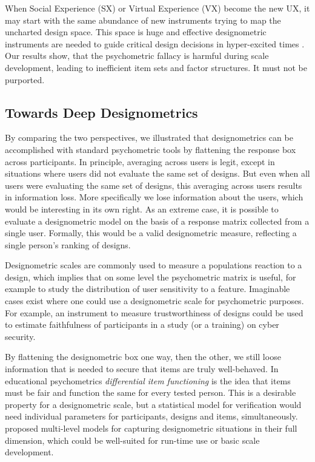 \documentclass[
  authoryear,
  review]{elsarticle}
\begin{document}
When Social Experience (SX) or Virtual Experience (VX) become the new
UX, it may start with the same abundance of new instruments trying to
map the uncharted design space. This space is huge and effective
designometric instruments are needed to guide critical design decisions
in hyper-excited times \citep{hypecycle2023}. Our results show, that the
psychometric fallacy is harmful during scale development, leading to
inefficient item sets and factor structures. It must not be purported.

\subsection{Towards Deep
Designometrics}\label{towards-deep-designometrics}

By comparing the two perspectives, we illustrated that designometrics
can be accomplished with standard psychometric tools by flattening the
response box across participants. In principle, averaging across users
is legit, except in situations where users did not evaluate the same set
of designs. But even when all users were evaluating the same set of
designs, this averaging across users results in information loss. More
specifically we lose information about the users, which would be
interesting in its own right. As an extreme case, it is possible to
evaluate a designometric model on the basis of a response matrix
collected from a single user. Formally, this would be a valid
designometric measure, reflecting a single person's ranking of designs.

Designometric scales are commonly used to measure a populations reaction
to a design, which implies that on some level the psychometric matrix is
useful, for example to study the distribution of user sensitivity to a
feature. Imaginable cases exist where one could use a designometric
scale for psychometric purposes. For example, an instrument to measure
trustworthiness of designs could be used to estimate faithfulness of
participants in a study (or a training) on cyber security.

By flattening the designometric box one way, then the other, we still
loose information that is needed to secure that items are truly
well-behaved. In educational psychometrics \emph{differential item
functioning} is the idea that items must be fair and function the same
for every tested person. This is a desirable property for a
designometric scale, but a statistical model for verification would need
individual parameters for participants, designs and items,
simultaneously. \citet{Schmettow2021_multilevel} proposed multi-level
models for capturing designometric situations in their full dimension,
which could be well-suited for run-time use or basic scale development.
\end{document}
